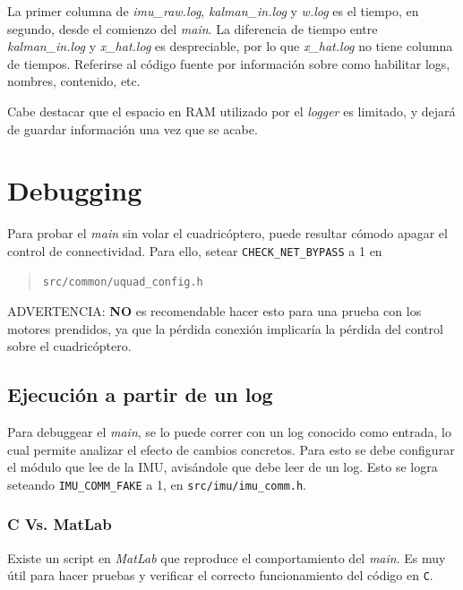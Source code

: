 \documentclass[main]{subfiles}
\begin{document}
La primer columna de \textit{imu\_raw.log}, \textit{kalman\_in.log} y \textit{w.log} es el tiempo, en segundo, desde el comienzo del \textit{main}. La diferencia de tiempo entre \textit{kalman\_in.log} y \textit{x\_hat.log} es despreciable, por lo que \textit{x\_hat.log} no tiene columna de tiempos. Referirse al código fuente por información sobre como habilitar logs, nombres, contenido, etc.

Cabe destacar que el espacio en RAM utilizado por el \textit{logger} es limitado, y dejará de guardar información una vez que se acabe.

\section{Debugging}
\label{sec:codigo:debugging}

Para probar el \textit{main} sin volar el cuadricóptero, puede resultar cómodo apagar el control de connectividad. Para ello, setear \verb+CHECK_NET_BYPASS+ a 1 en
\begin{quote}
\begin{verbatim}
src/common/uquad_config.h
\end{verbatim}
\end{quote}

ADVERTENCIA: \textbf{NO} es recomendable hacer esto para una prueba con los motores prendidos, ya que la pérdida conexión implicaría la pérdida del control sobre el cuadricóptero.

\subsection{Ejecución a partir de un log}
\label{sec:codigo:ejecucion-a-partir-de-un-log}

Para debuggear el \textit{main}, se lo puede correr con un log conocido como entrada, lo cual permite analizar el efecto de cambios concretos. Para esto se debe configurar el módulo que lee de la IMU, avisándole que debe leer de un log. Esto se logra seteando \verb+IMU_COMM_FAKE+ a 1, en \verb+src/imu/imu_comm.h+.

\subsubsection{C Vs. MatLab}
\label{sec:codigo:c-vs-matlab}

Existe un script en \textit{MatLab} que reproduce el comportamiento del \textit{main}. Es muy útil para hacer pruebas y verificar el correcto funcionamiento del código en \verb+C+.
\end{document}
